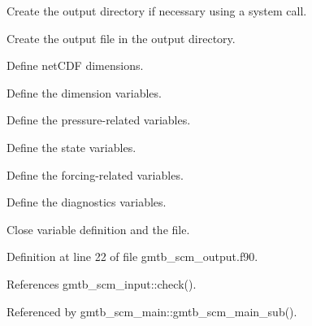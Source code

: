 \begin{DoxyItemize}
\item Create the output directory if necessary using a system call.
\item Create the output file in the output directory.
\item Define net\+C\+DF dimensions.
\item Define the dimension variables.
\item Define the pressure-\/related variables.
\item Define the state variables.
\item Define the forcing-\/related variables.
\item Define the diagnostics variables.
\item Close variable definition and the file.
\end{DoxyItemize}

Definition at line 22 of file gmtb\+\_\+scm\+\_\+output.\+f90.



References gmtb\+\_\+scm\+\_\+input\+::check().



Referenced by gmtb\+\_\+scm\+\_\+main\+::gmtb\+\_\+scm\+\_\+main\+\_\+sub().

